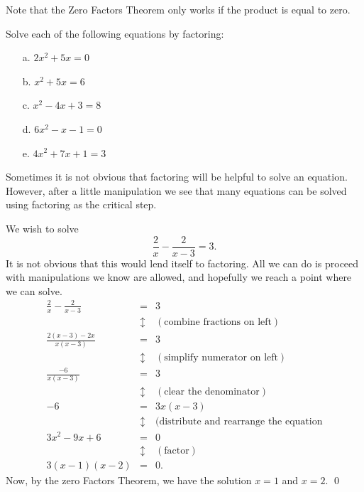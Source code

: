 \par

Note that the Zero Factors Theorem only works if the product is equal to zero.

\begin{question} Solve each of the following equations by factoring:
\begin{enumerate}
\item[a.] $2x^2+5x = 0$
\item[b.] $x^2+5x = 6$
\item[c.] $x^2-4x+3 = 8$
\item[d.] $6x^2-x-1 = 0$
\item[e.] $4x^2+7x+1 = 3$
\end{enumerate}
\end{question}

\par

Sometimes it is not obvious that factoring will be helpful to solve an equation. However, after a little manipulation we see that many equations can be solved using factoring as the critical step. 

\begin{eg} We wish to solve
\[
\frac{2}{x} - \frac{2}{x-3} = 3.
\]
It is not obvious that this would lend itself to factoring. All we can do is proceed with manipulations we know are allowed, and hopefully we reach a point where we can solve.
\begin{eqnarray*}
\frac{2}{x} - \frac{2}{x-3} & = & 3\\
& \updownarrow & (\mbox{combine fractions on left})\\
\frac{2(x-3)-2x}{x(x-3)} & = & 3\\
& \updownarrow & (\mbox{simplify numerator on left})\\
\frac{-6}{x(x-3)} & = & 3\\
& \updownarrow & (\mbox{clear the denominator})\\
-6 & = & 3x(x-3)\\
& \updownarrow & (\mbox{distribute and rearrange the equation}\\
3x^2-9x + 6 & = & 0\\
& \updownarrow & (\mbox{factor})\\
3(x-1)(x-2) & = & 0.
\end{eqnarray*}
Now, by the zero Factors Theorem, we have the solution $x=1$ and $x=2$. \qed \end{eg}




